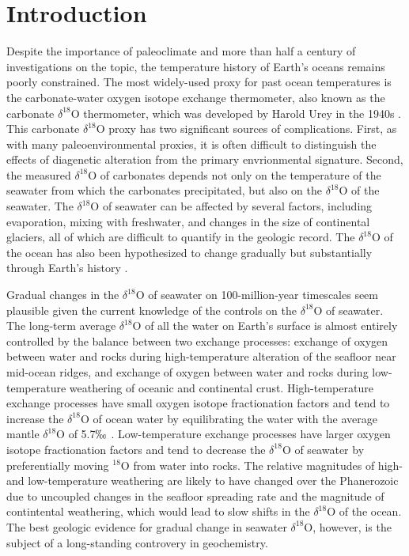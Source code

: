 \documentclass{article}
\newcommand{\deltao}{$\delta^{18}$}
\begin{document}
\section{Introduction}

Despite the importance of paleoclimate and more than half a century of investigations on the topic, the temperature history of Earth's oceans remains poorly constrained. The most widely-used proxy for past ocean temperatures is the carbonate-water oxygen isotope exchange thermometer, also known as the carbonate \deltao O thermometer, which was developed by Harold Urey in the 1940s \citep{Urey1947}. This carbonate \deltao O proxy has two significant sources of complications. First, as with many paleoenvironmental proxies, it is often difficult to distinguish the effects of diagenetic alteration from the primary envrionmental signature. Second, the measured \deltao O of carbonates depends not only on the temperature of the seawater from which the carbonates precipitated, but also on the \deltao O of the seawater. The \deltao O of seawater can be affected by several factors, including evaporation, mixing with freshwater, and changes in the size of continental glaciers, all of which are difficult to quantify in the geologic record. The 
\deltao O of the ocean has also been hypothesized to change gradually but substantially through Earth's history \citep{Jaffres2007,Veizer1999}. 

Gradual changes in the \deltao O of seawater on 100-million-year timescales seem plausible given the current knowledge of the controls on the \deltao O of seawater. The long-term average \deltao O of all the water on Earth's surface is almost entirely controlled by the balance between two exchange processes: exchange of oxygen between water and rocks during high-temperature alteration of the seafloor near mid-ocean ridges, and exchange of oxygen between water and rocks during low-temperature weathering of oceanic and continental crust. High-temperature exchange processes have small oxygen isotope fractionation factors and tend to increase the \deltao O of ocean water by equilibrating the water with the average mantle \deltao O of 5.7$\permil$ \citep{Gregory1991}. Low-temperature exchange processes have larger oxygen isotope fractionation factors and tend to decrease the \deltao O of seawater by preferentially moving $^{18}$O from water into rocks. The relative magnitudes of high- and low-temperature weathering are likely to have changed over the Phanerozoic due to uncoupled changes in the seafloor spreading rate \citep{Fornari1995,Tajika1993,Wallmann2001} and the magnitude of contintental weathering, which would lead to slow shifts in the \deltao O of the ocean. The best geologic evidence for gradual change in seawater \deltao O, however, is the subject of a long-standing controvery in geochemistry. 
\end{document}
